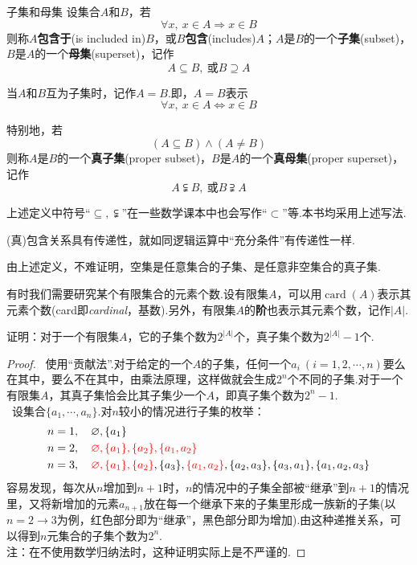 \documentclass[lang=cn, zihao=5]{elegantbook}
\newcommand{\sw}[1]{\boxed{\text{解法 #1}} \ }
\DeclareMathOperator{\card}{card}
\begin{document}
\begin{definition}{子集和母集}
	设集合$A$和$B$，若$$\forall x,~x \in A \Rightarrow x \in B$$则称$A$\textbf{包含于}(is included in)$B$，或$B$\textbf{包含}(includes)$A$；$A$是$B$的一个\textbf{子集}(subset)，$B$是$A$的一个\textbf{母集}(superset)，记作$$A \subseteq B,~ \text{或} B \supseteq A$$
	
	当$A$和$B$互为子集时，记作$A=B$.即，$A=B$表示$$\forall x,~ x \in A \Leftrightarrow x \in B$$
	
	特别地，若$$(A \subseteq B) \wedge (A \neq B)$$则称$A$是$B$的一个\textbf{真子集}(proper subset)，$B$是$A$的一个\textbf{真母集}(proper superset)，记作$$A \subsetneqq B,~ \text{或} B \supsetneqq A$$
\end{definition}
\begin{note}
	上述定义中符号“$\subseteq ,\subsetneqq$”在一些数学课本中也会写作“$\subset$”等.本书均采用上述写法.
\end{note}
\begin{remark}
	(真)包含关系具有传递性，就如同逻辑运算中“充分条件”有传递性一样.
\end{remark}

由上述定义，不难证明，空集是任意集合的子集、是任意非空集合的真子集.

有时我们需要研究某个有限集合的元素个数.设有限集$A$，可以用$\card (A)$表示其元素个数(card即\textit{cardinal}，基数).另外，有限集$A$的\textbf{阶}也表示其元素个数，记作$|A|$.

\begin{problem}
	证明：对于一个有限集$A$，它的子集个数为$2^{|A|}$个，真子集个数为$2^{|A|}-1$个.
\end{problem}
\begin{proof}
	\sw{一}使用“贡献法”.对于给定的一个$A$的子集，任何一个$a_i~(i=1,2,\cdots ,n)$要么在其中，要么不在其中，由乘法原理，这样做就会生成$2^n$个不同的子集.对于一个有限集$A$，其真子集恰会比其子集少一个$A$，即真子集个数为$2^n-1$. \\
	\sw{二}设集合$\{ a_1, \cdots ,a_n \}$.对$n$较小的情况进行子集的枚举：
	\begin{align*}
		n=1&,\quad \varnothing, \{ a_1 \} \\
		n=2&,\quad \color{red} \varnothing, \{ a_1 \},\{ a_2 \},\{ a_1,a_2 \} \color{black} \\
		n=3&,\quad \color{red} \varnothing, \{ a_1 \},\{ a_2 \}\color{black},\{ a_3 \},\color{red} \{a_1,a_2\} \color{black},\{ a_2,a_3 \},\{ a_3,a_1 \},\{ a_1,a_2,a_3 \}
	\end{align*}
	容易发现，每次从$n$增加到$n+1$时，$n$的情况中的子集全部被“继承”到$n+1$的情况里，又将新增加的元素$a_{n+1}$放在每一个继承下来的子集里形成一族新的子集(以$n=2 \to 3$为例，红色部分即为“继承”，黑色部分即为增加).由这种递推关系，可以得到$n$元集合的子集个数为$2^n$. \\
	注：在不使用数学归纳法时，这种证明实际上是不严谨的.
\end{proof}
\end{document}
